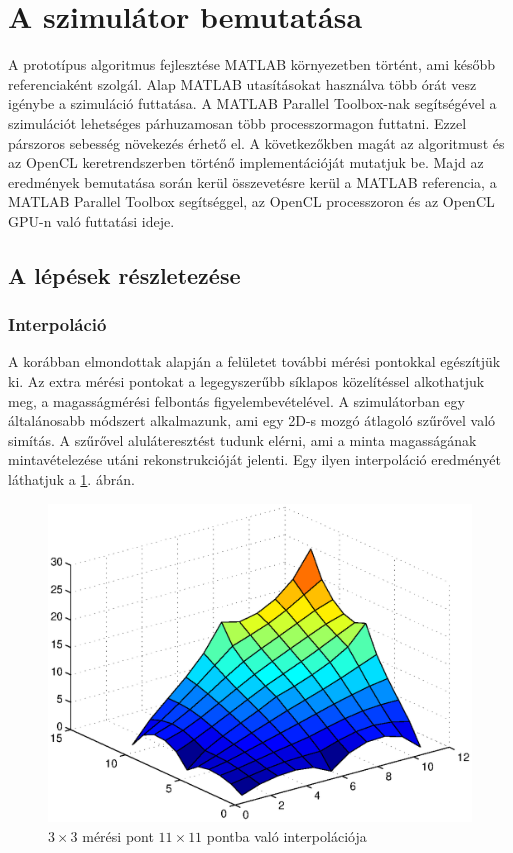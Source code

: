  \section{A szimulátor bemutatása} 
 A prototípus algoritmus fejlesztése MATLAB környezetben történt, ami később
 referenciaként szolgál.
 Alap MATLAB utasításokat használva több órát vesz igénybe a szimuláció
 futtatása.
 A MATLAB Parallel Toolbox-nak segítségével a szimulációt lehetséges
 párhuzamosan több processzormagon futtatni. Ezzel párszoros sebesség
 növekezés érhető el.
 A következőkben magát az algoritmust és az OpenCL keretrendszerben történő
 implementációját mutatjuk be.
 Majd az eredmények bemutatása során kerül összevetésre kerül a MATLAB
 referencia, a MATLAB Parallel Toolbox segítséggel, az OpenCL processzoron és
 az OpenCL GPU-n való futtatási ideje.
	
	\subsection{A lépések részletezése} 
		\subsubsection{Interpoláció}
		A korábban elmondottak alapján a felületet további mérési pontokkal egészítjük ki.
		Az extra mérési pontokat a legegyszerűbb síklapos közelítéssel alkothatjuk meg,
		a magasságmérési felbontás figyelembevételével.
		A szimulátorban egy általánosabb módszert alkalmazunk,
		ami egy 2D-s mozgó átlagoló szűrővel való simítás.
		A szűrővel aluláteresztést tudunk elérni, ami a minta magasságának
		mintavételezése utáni rekonstrukcióját jelenti. Egy ilyen interpoláció
		eredményét láthatjuk a \ref{fig:33pont}. ábrán. 
		
		\begin{figure}[!ht]
			\centering
			\includegraphics[width=0.95\columnwidth]{kepek/eps/3x3_interpol.eps}
			\caption{\scriptsize $3\times3$ mérési pont $11\times11$ pontba való interpolációja}
			\label{fig:33pont}
		\end{figure}
		

